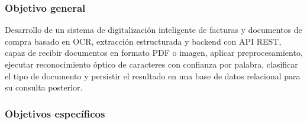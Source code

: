 \subsubsection{Objetivo general} \label{subsec:objetivo_general}
Desarrollo de un sistema de digitalización inteligente de facturas y documentos de compra basado en OCR, extracción estructurada y backend con API REST, capaz de recibir documentos en formato PDF o imagen, aplicar preprocesamiento, ejecutar reconocimiento óptico de caracteres con confianza por palabra, clasificar el tipo de documento y persistir el resultado en una base de datos relacional para su consulta posterior.

\subsubsection{Objetivos específicos} \label{subsec:objetivos_especificos}
